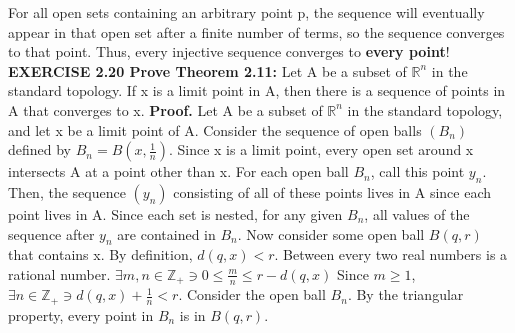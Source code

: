 \documentclass[12pt]{article}
\begin{document}
  \newline \newline
  For all open sets containing an arbitrary point p, the sequence will eventually appear in that open set after a finite number of terms, so the sequence converges to that point.
  \newline \newline
  Thus, every injective sequence converges to \textbf{every point}!
  \newpage
  \noindent
  \textbf{EXERCISE 2.20 Prove Theorem 2.11:} Let A be a subset of \(\mathbb{R}^n\) in the standard topology. If x is a limit point in A, then there is a sequence of points in A that converges to x.
  \newline \newline
  \textbf{Proof.}
  \newline
  Let A be a subset of \(\mathbb{R}^n\) in the standard topology, and let x be a limit point of A.
  \newline \newline
  Consider the sequence of open balls \((B_n)\) defined by \(B_n = B(x, \frac{1}{n})\).
  \newline \newline
  Since x is a limit point, every open set around x intersects A at a point other than x.
  \newline
  For each open ball \(B_n\), call this point \(y_n\).
  \newline \newline
  Then, the sequence \((y_n)\) consisting of all of these points lives in A since each point lives in A.
  \newline
  Since each set is nested, for any given \(B_n\), all values of the sequence after \(y_n\) are contained in \(B_n\).
  \newline \newline
  Now consider some open ball \(B(q, r)\) that contains x.
  \newline
  By definition, \(d(q,x) < r\). \newline
  Between every two real numbers is a rational number.
  \newline
  \(\exists m,n \in \mathbb{Z}_+ \ni 0 \leq \frac{m}{n} \leq r - d(q,x)\)
  \newline Since \(m \geq 1\), \(\exists n \in \mathbb{Z}_+ \ni d(q,x) + \frac{1}{n} < r\).
  \newline \newline
  Consider the open ball \(B_n\). \newline
  By the triangular property, every point in \(B_n\) is in \(B(q,r)\).
\end{document}
